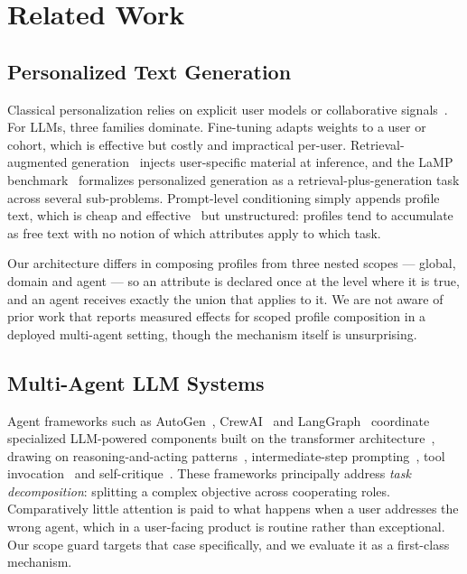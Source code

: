\documentclass[journal]{IEEEtran}
\begin{document}
\section{Related Work}

\subsection{Personalized Text Generation}
Classical personalization relies on explicit user models or collaborative
signals~\cite{koren2009matrix, zhang2020explainable}. For LLMs, three families
dominate. Fine-tuning adapts weights to a user or cohort, which is effective
but costly and impractical per-user. Retrieval-augmented
generation~\cite{lewis2020rag} injects user-specific material at inference,
and the LaMP benchmark~\cite{salemi2023lamp} formalizes personalized generation
as a retrieval-plus-generation task across several sub-problems. Prompt-level
conditioning simply appends profile text, which is cheap and
effective~\cite{brown2020fewshot} but unstructured: profiles tend to accumulate
as free text with no notion of which attributes apply to which task.

Our architecture differs in composing profiles from three nested scopes ---
global, domain and agent --- so an attribute is declared once at the level
where it is true, and an agent receives exactly the union that applies to it.
We are not aware of prior work that reports measured effects for scoped profile
composition in a deployed multi-agent setting, though the mechanism itself is
unsurprising.

\subsection{Multi-Agent LLM Systems}
Agent frameworks such as AutoGen~\cite{wu2023autogen},
CrewAI~\cite{moura2024crewai} and LangGraph~\cite{langgraph2024} coordinate
specialized LLM-powered components built on the transformer
architecture~\cite{vaswani2017attention}, drawing on reasoning-and-acting
patterns~\cite{yao2023react}, intermediate-step
prompting~\cite{wei2022cot}, tool invocation~\cite{schick2023toolformer} and
self-critique~\cite{shinn2023reflexion}. These frameworks principally address
\emph{task decomposition}: splitting a complex objective across cooperating
roles. Comparatively little attention is paid to what happens when a user
addresses the wrong agent, which in a user-facing product is routine rather
than exceptional. Our scope guard targets that case specifically, and we
evaluate it as a first-class mechanism.
\end{document}
